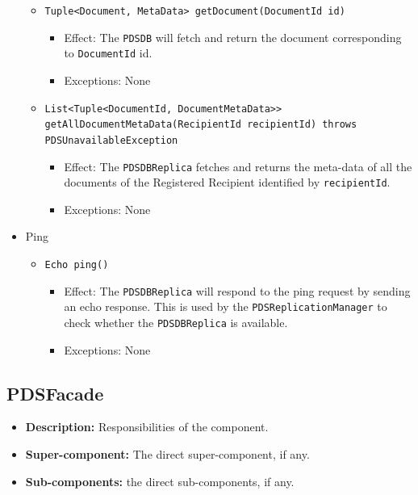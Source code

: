 \documentclass[a4paper,10pt]{article}
\begin{document}
\begin{itemize}
\begin{itemize}
    

        \item \texttt{Tuple<Document, MetaData> getDocument(DocumentId id)}
        \begin{itemize}
            \item Effect: The \texttt{PDSDB} will fetch and return the document corresponding to \texttt{DocumentId} id.
            \item Exceptions: None
         \end{itemize}
         
         
         \item \texttt{List<Tuple<DocumentId, DocumentMetaData>> getAllDocumentMetaData(RecipientId recipientId) throws PDSUnavailableException}
        \begin{itemize}
            \item Effect: The \texttt{PDSDBReplica} fetches and returns the meta-data of all the documents of the Registered Recipient identified by \texttt{recipientId}.
            \item Exceptions: None
         \end{itemize}
    \end{itemize}
    
    \item Ping
    \begin{itemize}
        \item \texttt{Echo ping()}
        \begin{itemize}
            \item Effect: The \texttt{PDSDBReplica} will respond to the ping request by sending an echo response. This is used by the \texttt{PDSReplicationManager} to check whether the \texttt{PDSDBReplica} is available.
            \item Exceptions: None
        \end{itemize}
    \end{itemize}
\end{itemize}

\subsection{PDSFacade}
\begin{itemize}
    \item \textbf{Description:} Responsibilities of the component.
    \item \textbf{Super-component:} The direct super-component, if any.
    \item \textbf{Sub-components:} the direct sub-components, if any.
\end{itemize}
\end{document}
